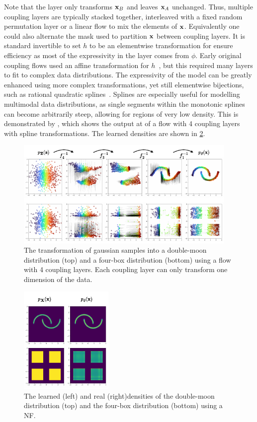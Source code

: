 Note that the layer only transforms $\mathbf{x}_B$ and leaves $\mathbf{x}_A$ unchanged.
Thus, multiple coupling layers are typically stacked together, interleaved with a fixed random permutation layer or a linear flow to mix the elements of $\mathbf{x}$.
Equivalently one could also alternate the mask used to partition $\mathbf{x}$ between coupling layers.
It is standard invertible to set $h$ to be an elementwise transformation for ensure efficiency as most of the expressivity in the layer comes from $\phi$.
Early original coupling flows used an affine transformation for $h$~\cite{RealNVP}, but this required many layers to fit to complex data distributions.
The expressivity of the model can be greatly enhanced using more complex transformations, yet still elementwise bijections, such as rational quadratic splines~\cite{NeuralSplineFlows}.
Splines are especially useful for modelling multimodal data distributions, as single segments within the monotonic splines can become arbitrarily steep, allowing for regions of very low density.
This is demonstrated by , which shows the output at of a flow with 4 coupling layers with spline transformations.
The learned densities are shown in \cref{fig:density}.

\begin{figure}[ht]
    \centering
    \includegraphics[width=0.95\textwidth]{Figures/transformers/samples.pdf}
    \caption{The transformation of gaussian samples into a double-moon distribution (top) and a four-box distribution (bottom) using a flow with 4 coupling layers. Each coupling layer can only transform one dimension of the data.}
    \label{fig:samples}
\end{figure}

\begin{figure}[ht]
    \centering
    \includegraphics[width=0.4\textwidth]{Figures/transformers/densities.pdf}
    \caption{The learned (left) and real (right)densities of the double-moon distribution (top) and the four-box distribution (bottom) using a NF.}
    \label{fig:density}
\end{figure}

